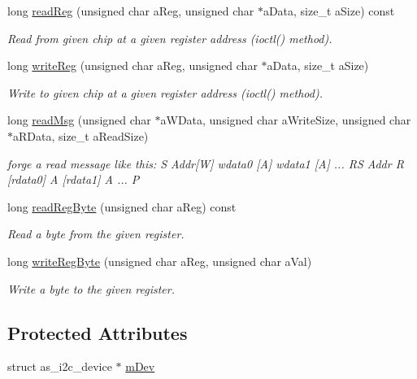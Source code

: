 \begin{DoxyCompactItemize}
long \hyperlink{classHostI2cBus_a841737a0dbc60be2d370f56e7f1a64b1}{read\+Reg} (unsigned char a\+Reg, unsigned char $\ast$a\+Data, size\+\_\+t a\+Size) const
\begin{DoxyCompactList}\small\item\em Read from given chip at a given register address (ioctl() method). \end{DoxyCompactList}\item 
long \hyperlink{classHostI2cBus_a6f7a8cf477287727ee6861bfc8007788}{write\+Reg} (unsigned char a\+Reg, unsigned char $\ast$a\+Data, size\+\_\+t a\+Size)
\begin{DoxyCompactList}\small\item\em Write to given chip at a given register address (ioctl() method). \end{DoxyCompactList}\item 
long \hyperlink{classHostI2cBus_a797e010bb0530a22c8f3e98fe37d9e2b}{read\+Msg} (unsigned char $\ast$a\+W\+Data, unsigned char a\+Write\+Size, unsigned char $\ast$a\+R\+Data, size\+\_\+t a\+Read\+Size)
\begin{DoxyCompactList}\small\item\em forge a read message like this\+: S Addr\mbox{[}W\mbox{]} wdata0 \mbox{[}A\mbox{]} wdata1 \mbox{[}A\mbox{]} ... RS Addr R \mbox{[}rdata0\mbox{]} A \mbox{[}rdata1\mbox{]} A ... P \end{DoxyCompactList}\item 
long \hyperlink{classHostI2cBus_a4f8ab723d256dde2f2c1d38ecb36c34e}{read\+Reg\+Byte} (unsigned char a\+Reg) const
\begin{DoxyCompactList}\small\item\em Read a byte from the given register. \end{DoxyCompactList}\item 
long \hyperlink{classHostI2cBus_a6083db2184ecc41d05fe67ba9fc40959}{write\+Reg\+Byte} (unsigned char a\+Reg, unsigned char a\+Val)
\begin{DoxyCompactList}\small\item\em Write a byte to the given register. \end{DoxyCompactList}\end{DoxyCompactItemize}
\subsection*{Protected Attributes}
\begin{DoxyCompactItemize}
\item 
struct as\+\_\+i2c\+\_\+device $\ast$ \hyperlink{classHostI2cBus_a981bd4515a65a782ab00fdb77f3476ce}{m\+Dev}
\end{DoxyCompactItemize}


